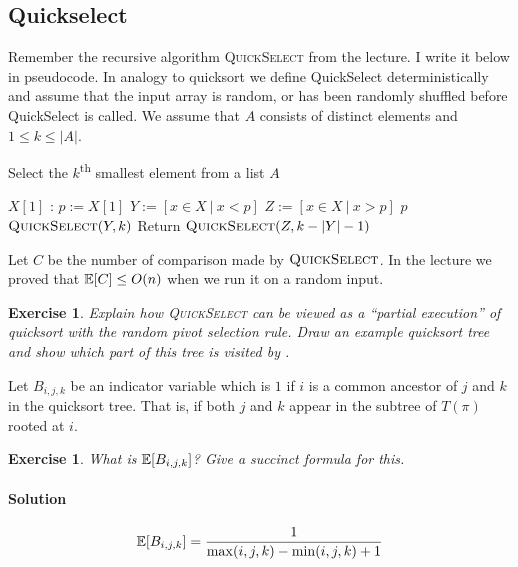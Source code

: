 \documentclass[12pt,a4]{article}
\newcommand{\nth}[1]{#1\textsuperscript{th}}
\newcommand{\E}{\mathop{\mathbb{E\/}}}
\newtheorem{exercise}[theorem]{Exercise}
\begin{document}
\subsection{Quickselect}

Remember the recursive algorithm \textsc{QuickSelect} from the lecture. I write
it below in pseudocode. In analogy to quicksort we define QuickSelect deterministically
and assume that the input array is random, or has been randomly shuffled before
QuickSelect is called. We assume that $A$ consists of distinct elements and
$1 \leq k \leq |A|$.

\begin{algorithm}
\caption{Select the \nth{$k$} smallest element from a list $A$}
\begin{algorithmic}[1]
    \State \Return $X[1]$
  \Else:
  \State $p := X[1]$
  \State $Y:= [ x \in X \ | \ x < p]$
  \State $Z := [ x \in X \ | \ x > p]$
   	\State \Return $p$
     	\State \Return $\textsc{QuickSelect}(Y,k)$
  \Else
  	\State Return $\textsc{QuickSelect}(Z, k- |Y| - 1)$
  \EndIf
  \EndIf
\EndProcedure
\end{algorithmic}
\end{algorithm}


Let $C$ be the number of comparison made by $\textsc{QuickSelect}$. In the 
lecture we proved that $\E[C] \leq O(n)$ when we run it on a random input.

\begin{exercise}
	Explain how \textsc{QuickSelect} can be viewed as a ``partial execution'' of quicksort
	with the random pivot selection rule.
	Draw an example quicksort tree and show which part of this tree is visited
	by .
\end{exercise}

Let $B_{i,j,k}$ be an indicator variable which is $1$ if $i$ is a common ancestor
of $j$ and $k$ in the quicksort tree. That is, if both $j$ and $k$ appear in the 
subtree of $T(\pi)$ rooted at $i$.

\begin{exercise}
   What is $\E[B_{i,j,k}]$? Give a succinct formula for this.
   
   \paragraph{Solution}
   $$
   \E[B_{i,j,k}]= \frac 1 {\max(i,j,k)-\min(i,j,k)+1}
   $$
\end{exercise}
\end{document}
